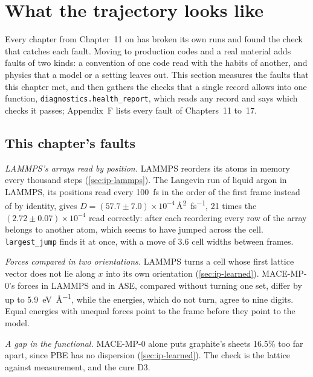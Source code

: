 \section{What the trajectory looks like}
\label{sec:ip-trajectory}

Every chapter from Chapter~11 on has broken its own runs and found the
check that catches each fault. Moving to production codes and a real
material adds faults of two kinds: a convention of one code read with the
habits of another, and physics that a model or a setting leaves out. This
section measures the faults that this chapter met, and then gathers the
checks that a single record allows into one function,
\texttt{diagnostics.health\_report}, which reads any record and says which
checks it passes; Appendix~F lists every fault of Chapters~11 to~17.

\subsection*{This chapter's faults}

\textit{LAMMPS's arrays read by position.} LAMMPS reorders its atoms in
memory every thousand steps (\cref{sec:ip-lammps}). The Langevin run of
liquid argon in LAMMPS, its positions read every \SI{100}{\femto\second}
in the order of the first frame instead of by identity, gives $D =
(57.7 \pm 7.0)\times10^{-4}$\,\si{\angstrom\squared\per\femto\second},
21 times the $(2.72 \pm 0.07)\times10^{-4}$ read correctly: after each
reordering every row of the array belongs to another atom, which seems to
have jumped across the cell. \texttt{largest\_jump} finds it at once, with
a move of 3.6 cell widths between frames.

\textit{Forces compared in two orientations.} LAMMPS turns a cell whose
first lattice vector does not lie along $x$ into its own orientation
(\cref{sec:ip-learned}). MACE-MP-0's forces in LAMMPS and in ASE, compared
without turning one set, differ by up to
\SI{5.9}{\electronvolt\per\angstrom}, while the energies, which do not
turn, agree to nine digits. Equal energies with unequal forces point to
the frame before they point to the model.

\textit{A gap in the functional.} MACE-MP-0 alone puts graphite's sheets
16.5\% too far apart, since PBE has no dispersion
(\cref{sec:ip-learned}). The check is the lattice against measurement,
and the cure D3.

